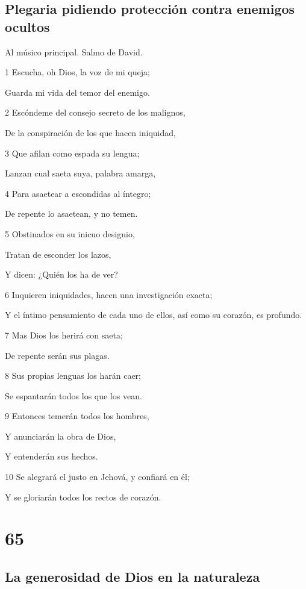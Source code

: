 \section*{Plegaria pidiendo protección contra enemigos ocultos}

\par Al músico principal. Salmo de David.

\par 1 Escucha, oh Dios, la voz de mi queja;
\par Guarda mi vida del temor del enemigo.
\par 2 Escóndeme del consejo secreto de los malignos,
\par De la conspiración de los que hacen iniquidad,
\par 3 Que afilan como espada su lengua;
\par Lanzan cual saeta suya, palabra amarga,
\par 4 Para asaetear a escondidas al íntegro;
\par De repente lo asaetean, y no temen.
\par 5 Obstinados en su inicuo designio,
\par Tratan de esconder los lazos,
\par Y dicen: ¿Quién los ha de ver?
\par 6 Inquieren iniquidades, hacen una investigación exacta;
\par Y el íntimo pensamiento de cada uno de ellos, así como su corazón, es profundo.
\par 7 Mas Dios los herirá con saeta;
\par De repente serán sus plagas.
\par 8 Sus propias lenguas los harán caer;
\par Se espantarán todos los que los vean.
\par 9 Entonces temerán todos los hombres,
\par Y anunciarán la obra de Dios,
\par Y entenderán sus hechos.
\par 10 Se alegrará el justo en Jehová, y confiará en él;
\par Y se gloriarán todos los rectos de corazón.

\chapter{65}

\section*{La generosidad de Dios en la naturaleza}

